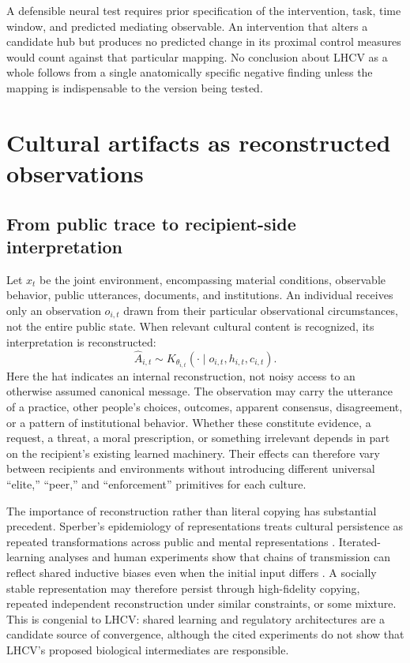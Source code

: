 \documentclass[11pt,a4paper]{article}
\begin{document}
A defensible neural test requires prior specification of the intervention, task, time window, and predicted mediating observable. An intervention that alters a candidate hub but produces no predicted change in its proximal control measures would count against that particular mapping. No conclusion about LHCV as a whole follows from a single anatomically specific negative finding unless the mapping is indispensable to the version being tested.

\section{Cultural artifacts as reconstructed observations}
\subsection{From public trace to recipient-side interpretation}
Let $x_t$ be the joint environment, encompassing material conditions, observable behavior, public utterances, documents, and institutions. An individual receives only an observation $o_{i,t}$ drawn from their particular observational circumstances, not the entire public state. When relevant cultural content is recognized, its interpretation is reconstructed:
\begin{equation}
 \widehat A_{i,t}\sim K_{\theta_{i,t}}(\cdot\mid o_{i,t},h_{i,t},c_{i,t}).
 \label{eq:reconstruct}
\end{equation}
Here the hat indicates an internal reconstruction, not noisy access to an otherwise assumed canonical message. The observation may carry the utterance of a practice, other people's choices, outcomes, apparent consensus, disagreement, or a pattern of institutional behavior. Whether these constitute evidence, a request, a threat, a moral prescription, or something irrelevant depends in part on the recipient's existing learned machinery. Their effects can therefore vary between recipients and environments without introducing different universal ``elite,'' ``peer,'' and ``enforcement'' primitives for each culture.

The importance of reconstruction rather than literal copying has substantial precedent. Sperber's epidemiology of representations treats cultural persistence as repeated transformations across public and mental representations \citep{sperber1996}. Iterated-learning analyses and human experiments show that chains of transmission can reflect shared inductive biases even when the initial input differs \citep{griffiths2007,kalish2007}. A socially stable representation may therefore persist through high-fidelity copying, repeated independent reconstruction under similar constraints, or some mixture. This is congenial to LHCV: shared learning and regulatory architectures are a candidate source of convergence, although the cited experiments do not show that LHCV's proposed biological intermediates are responsible.
\end{document}
